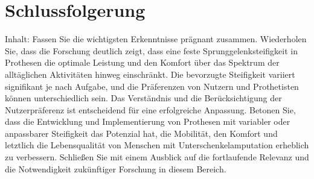 \section{Schlussfolgerung}
Inhalt: Fassen Sie die wichtigsten Erkenntnisse prägnant zusammen. Wiederholen Sie, dass die Forschung deutlich zeigt, dass eine feste Sprunggelenksteifigkeit in Prothesen die optimale Leistung und den Komfort über das Spektrum der alltäglichen Aktivitäten hinweg einschränkt. Die bevorzugte Steifigkeit variiert signifikant je nach Aufgabe, und die Präferenzen von Nutzern und Prothetisten können unterschiedlich sein. Das Verständnis und die Berücksichtigung der Nutzerpräferenz ist entscheidend für eine erfolgreiche Anpassung. Betonen Sie, dass die Entwicklung und Implementierung von Prothesen mit variabler oder anpassbarer Steifigkeit das Potenzial hat, die Mobilität, den Komfort und letztlich die Lebensqualität von Menschen mit Unterschenkelamputation erheblich zu verbessern. Schließen Sie mit einem Ausblick auf die fortlaufende Relevanz und die Notwendigkeit zukünftiger Forschung in diesem Bereich.